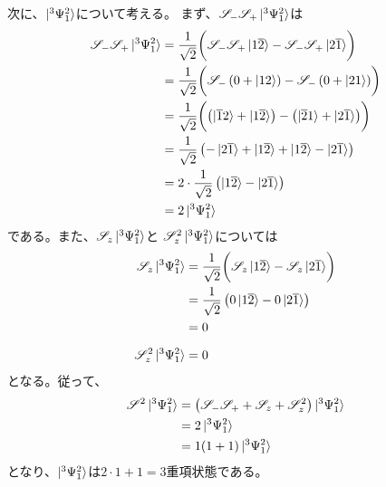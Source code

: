 次に、$\ket{^3\Psi_1^2}$について考える。
まず、$\mathscr{S}_- \mathscr{S}_+ \ket{^3\Psi_1^2}$は
\begin{align}
	\mathscr{S}_- \mathscr{S}_+ \ket{^3\Psi_1^2}
&=
	\frac{1}{\sqrt{2}}
	\biggl(
		\mathscr{S}_- \mathscr{S}_+ \ket{\aorb{1}\borb{2}}
		-
		\mathscr{S}_- \mathscr{S}_+ \ket{\aorb{2}\borb{1}}
	\biggr) \\
%
%
&=
	\frac{1}{\sqrt{2}}
	\biggl(
		\mathscr{S}_-\left(
			0 +\ket{\aorb{1}\aorb{2}}
		\right)
		-
		\mathscr{S}_-\left(
			0 +\ket{\aorb{2}\aorb{1}}
		\right)
	\biggr) \\
%
%
&=
	\frac{1}{\sqrt{2}}
	\biggl(
		\left(
			\ket{\borb{1}\aorb{2}}
			+
			\ket{\aorb{1}\borb{2}}
		\right)
		-
		\left(
			\ket{\borb{2}\aorb{1}}
			+
			\ket{\aorb{2}\borb{1}}
		\right)
	\biggr) \\
%
%
&=
	\frac{1}{\sqrt{2}}
	\left(
		-\ket{\aorb{2}\borb{1}}
		+\ket{\aorb{1}\borb{2}}
		+\ket{\aorb{1}\borb{2}}
		-\ket{\aorb{2}\borb{1}}
	\right) \\
%
%
&=
	2 \cdot
	\frac{1}{\sqrt{2}}
	\left(
		\ket{\aorb{1}\borb{2}}
		-
		\ket{\aorb{2}\borb{1}}
	\right) \\
%
%
&=
	2 \ket{^3\Psi_1^2}
\end{align}
である。また、$\mathscr{S}_z \ket{^3\Psi_1^2}$と
$\mathscr{S}_z^2 \ket{^3\Psi_1^2}$については
\begin{align}
	\mathscr{S}_z \ket{^3\Psi_1^2}
&=
	\frac{1}{\sqrt{2}}
	\biggl(
		\mathscr{S}_z \ket{\aorb{1}\borb{2}}
		-
		\mathscr{S}_z \ket{\aorb{2}\borb{1}}
	\biggr) \\
%
%
&=
	\frac{1}{\sqrt{2}}
	\left(
		0 \ket{\aorb{1}\borb{2}}
		-
		0 \ket{\aorb{2}\borb{1}}
	\right) \\
%
%
&=
	0 \\[2mm]
%
%
	\mathscr{S}_z^2 \ket{^3\Psi_1^2}
&=
	0
\end{align}
となる。従って、
\begin{align}
	\mathscr{S}^2 \ket{^3\Psi_1^2}
&=
	\left(
		\mathscr{S}_- \mathscr{S}_+
		+
		\mathscr{S}_z
		+
		\mathscr{S}_z^2
	\right) \ket{^3\Psi_1^2} \\
%
%
&=
	2 \ket{^3\Psi_1^2} \\
%
%
&=
	1 (1+1) \ket{^3\Psi_1^2}
\end{align}
となり、$\ket{^3\Psi_1^2}$は$2\cdot 1+1=3$重項状態である。

